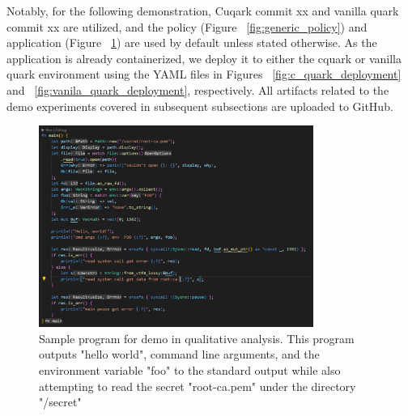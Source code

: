 Notably, for the following demonstration, Cuqark commit xx and vanilla quark commit xx are utilized, and the policy (Figure ~\ref{fig:generic_policy}) and application (Figure ~\ref{fig:analysis_workload}) are used by default unless stated otherwise. As the application is already containerized, 
we deploy it to either the cquark or vanilla quark environment using the YAML files in Figures ~\ref{fig:c_quark_deployment} and ~\ref{fig:vanila_quark_deployment}, respectively.  All artifacts related to the demo experiments covered in subsequent subsections are uploaded to GitHub.



\begin{figure}[H]
    \centering
    \includegraphics[width=0.8\textwidth]{images/analysis_workload.PNG}
    \caption[Sample program for demo in qualitative analysis]{Sample program for demo in qualitative analysis. This program outputs "hello world", command line arguments, and the environment variable "foo" to the standard output while also attempting to read the secret "root-ca.pem" under the directory "/secret"}
    \label{fig:analysis_workload}
\end{figure}




